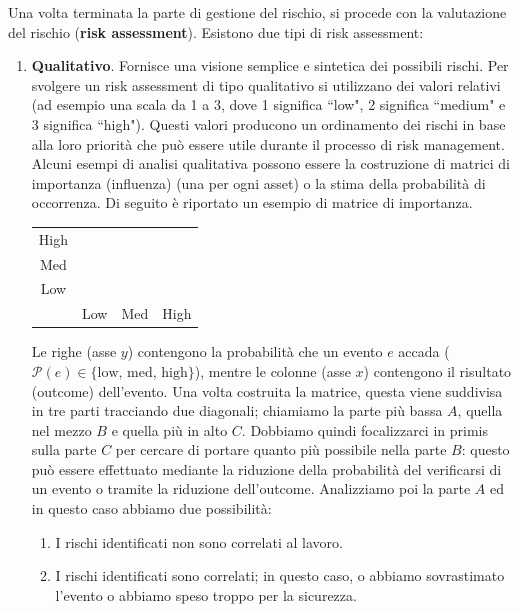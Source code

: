 Una volta terminata la parte di gestione del rischio, si procede con la valutazione del rischio (\textbf{risk assessment}). Esistono due tipi di risk assessment:
\begin{enumerate}
	\item \textbf{Qualitativo}. Fornisce una visione semplice e sintetica dei possibili rischi.
	Per svolgere un risk assessment di tipo qualitativo si utilizzano dei valori relativi (ad esempio una scala da 1 a 3, dove 1 significa \textquotedblleft low", 2 significa \textquotedblleft medium" e 3 significa \textquotedblleft high"). Questi valori producono un ordinamento dei rischi in base alla loro priorità che può essere utile durante il processo di risk management.\\
	Alcuni esempi di analisi qualitativa possono essere la costruzione di matrici di importanza (influenza) (una per ogni asset) o la stima della probabilità di occorrenza. Di seguito è riportato un esempio di matrice di importanza.
	\begin{center}
		\begin{tabular}{ c|c|c|c| }
			\cline{2-4}
			High &  &  & \\
			\cline{2-4}
			Med &  &  & \\
			\cline{2-4}
			Low &  &  & \\
			\cline{2-4}
				\multicolumn{1}{r}{} &  \multicolumn{1}{c}{Low}
			& \multicolumn{1}{c}{Med} & \multicolumn{1}{c}{High} \\
		\end{tabular}
	\end{center}
	Le righe (asse $y$) contengono la probabilità che un evento $e$ accada ($\mathcal{P}(e)\in\{\text{low, med, high}\}$), mentre le colonne (asse $x$) contengono il risultato (outcome) dell'evento. Una volta costruita la matrice, questa viene suddivisa in tre parti tracciando due diagonali; chiamiamo la parte più bassa $A$, quella nel mezzo $B$ e quella più in alto $C$. Dobbiamo quindi focalizzarci in primis sulla parte $C$ per cercare di portare quanto più possibile nella parte $B$: questo può essere effettuato mediante la riduzione della probabilità del verificarsi di un evento o tramite la riduzione dell'outcome. Analizziamo poi la parte $A$ ed in questo caso abbiamo due possibilità:
	\begin{enumerate}
		\item I rischi identificati non sono correlati al lavoro.
		\item I rischi identificati sono correlati; in questo caso, o abbiamo sovrastimato l'evento o abbiamo speso troppo per la sicurezza.

\end{enumerate}
\end{enumerate}
